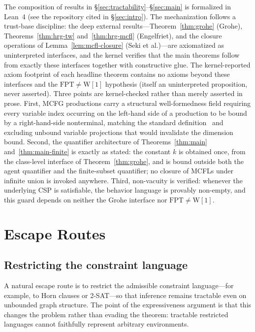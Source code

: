 \documentclass[runningheads]{llncs}
\begin{document}
The composition of results in \S\ref{sec:tractability}--\S\ref{sec:main} is formalized in Lean~4 (see the repository cited in \S\ref{sec:intro}).
The mechanization follows a trust-base discipline: the deep external results---Theorem~\ref{thm:grohe} (Grohe), Theorems~\ref{thm:hrg-tw} and~\ref{thm:hrg-mcfl} (Engelfriet), and the closure operations of Lemma~\ref{lem:mcfl-closure} (Seki et al.)---are axiomatized as uninterpreted interfaces, and the kernel verifies that the main theorems follow from exactly these interfaces together with constructive glue.
The kernel-reported axiom footprint of each headline theorem contains no axioms beyond these interfaces and the $\mathrm{FPT} \neq \mathrm{W}[1]$ hypothesis (itself an uninterpreted proposition, never asserted).
Three points are kernel-checked rather than merely asserted in prose.
First, MCFG productions carry a structural well-formedness field requiring every variable index occurring on the left-hand side of a production to be bound by a right-hand-side nonterminal, matching the standard definition~\cite{Seki91} and excluding unbound variable projections that would invalidate the dimension bound.
Second, the quantifier architecture of Theorems~\ref{thm:main} and~\ref{thm:main-finite} is exactly as stated: the constant $k$ is obtained once, from the class-level interface of Theorem~\ref{thm:grohe}, and is bound outside both the agent quantifier and the finite-subset quantifier; no closure of MCFLs under infinite union is invoked anywhere.
Third, non-vacuity is verified: whenever the underlying CSP is satisfiable, the behavior language is provably non-empty, and this guard depends on neither the Grohe interface nor $\mathrm{FPT} \neq \mathrm{W}[1]$.

\section{Escape Routes}\label{sec:escape}

\subsection{Restricting the constraint language}\label{sec:expressiveness}\label{sec:restricted}

A natural escape route is to restrict the admissible constraint language---for example, to Horn clauses or 2-SAT---so that inference remains tractable even on unbounded graph structure. The point of the expressiveness argument is that this changes the problem rather than evading the theorem: tractable restricted languages cannot faithfully represent arbitrary environments.
\end{document}
